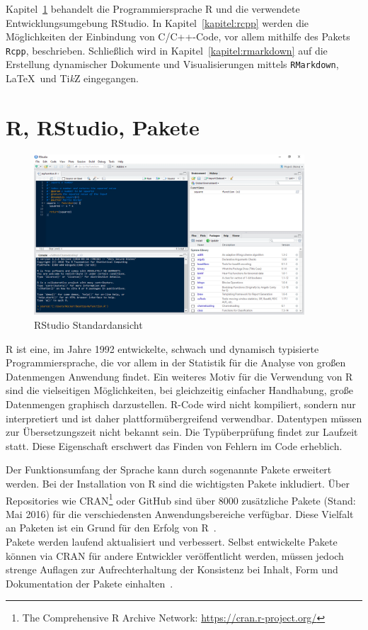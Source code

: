 Kapitel~\ref{kapitel:R} behandelt die Programmiersprache R und die verwendete Entwicklungsumgebung RStudio. In Kapitel~\ref{kapitel:rcpp} werden die Möglichkeiten der Einbindung von C/C++-Code, vor allem mithilfe des Pakets \texttt{Rcpp}, beschrieben. Schließlich wird in Kapitel~\ref{kapitel:rmarkdown} auf die Erstellung dynamischer Dokumente und Visualisierungen mittels \texttt{RMarkdown}, \LaTeX\ und Ti\textit{k}Z eingegangen.
\section{R, RStudio, Pakete}
\label{kapitel:R}
\begin{figure}[t]
\centering
\includegraphics[width=0.9\textwidth]{abbildungen/rstudio}
\caption{RStudio Standardansicht}
\label{abb:rstudio}
\end{figure}
R ist eine, im Jahre 1992 entwickelte, schwach und dynamisch typisierte Programmiersprache, die vor allem in der Statistik für die Analyse von großen Datenmengen Anwendung findet. Ein weiteres Motiv für die Verwendung von R sind die vielseitigen Möglichkeiten, bei gleichzeitig einfacher Handhabung, große Datenmengen graphisch darzustellen. R-Code wird nicht kompiliert, sondern nur interpretiert und ist daher plattformübergreifend verwendbar. Datentypen müssen zur Übersetzungszeit nicht bekannt sein. Die Typüberprüfung findet zur Laufzeit statt. Diese Eigenschaft erschwert das Finden von Fehlern im Code erheblich.

Der Funktionsumfang der Sprache kann durch sogenannte Pakete erweitert werden. Bei der Installation von R sind die wichtigsten Pakete inkludiert. Über Repositories wie CRAN\footnote{The Comprehensive R Archive Network: \url{https://cran.r-project.org/}} oder GitHub sind über 8000 zusätzliche Pakete (Stand: Mai 2016) für die verschiedensten Anwendungsbereiche verfügbar. Diese Vielfalt an Paketen ist ein Grund für den Erfolg von R~\cite[S.~18]{wickham2015r}.
\\
Pakete werden laufend aktualisiert und verbessert. Selbst entwickelte Pakete können via CRAN für andere Entwickler veröffentlicht werden, müssen jedoch strenge Auflagen zur Aufrechterhaltung der Konsistenz bei Inhalt, Form und Dokumentation der Pakete einhalten~\cite{wickham2015r}.  

